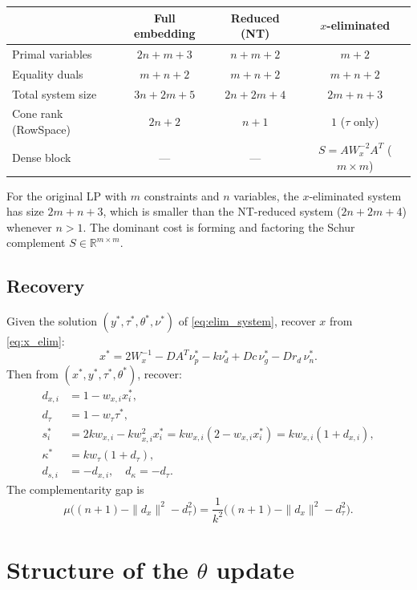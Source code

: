 \documentclass{article}
\newcommand{\R}{\mathbb{R}}
\begin{document}
\begin{center}
\begin{tabular}{lccc}
  & Full embedding & Reduced (NT) & $x$-eliminated \\
  \hline
  Primal variables & $2n + m + 3$ & $n + m + 2$ & $m + 2$ \\
  Equality duals & $m + n + 2$ & $m + n + 2$ & $m + n + 2$ \\
  Total system size & $3n + 2m + 5$ & $2n + 2m + 4$ & $2m + n + 3$ \\
  Cone rank (RowSpace) & $2n + 2$ & $n + 1$ & $1$ ($\tau$ only) \\
  Dense block & --- & --- & $S = AW_x^{-2}A^T$ ($m \times m$) \\
\end{tabular}
\end{center}

For the original LP with $m$ constraints and $n$ variables, the $x$-eliminated system has size $2m + n + 3$, which is smaller than the NT-reduced system ($2n + 2m + 4$) whenever $n > 1$. The dominant cost is forming and factoring the Schur complement $S \in \R^{m \times m}$.

\subsection{Recovery}

Given the solution $(y^*, \tau^*, \theta^*, \nu^*)$ of \eqref{eq:elim_system}, recover $x$ from \eqref{eq:x_elim}:
\[
  x^* = 2W_x^{-1} - DA^T\nu_p^* - k\nu_d^* + Dc\,\nu_g^* - Dr_d\,\nu_n^*.
\]
Then from $(x^*, y^*, \tau^*, \theta^*)$, recover:
\begin{align}
  d_{x,i} &= 1 - w_{x,i} x^*_i, \\
  d_\tau &= 1 - w_\tau \tau^*, \\
  s^*_i &= 2k w_{x,i} - k w_{x,i}^2 x^*_i = k w_{x,i}(2 - w_{x,i} x^*_i) = k w_{x,i}(1 + d_{x,i}), \\
  \kappa^* &= k w_\tau(1 + d_\tau), \\
  d_{s,i} &= -d_{x,i}, \quad d_\kappa = -d_\tau.
\end{align}
The complementarity gap is
\[
  \mu \bigl((n+1) - \|d_x\|^2 - d_\tau^2\bigr) = \frac{1}{k^2}\bigl((n+1) - \|d_x\|^2 - d_\tau^2\bigr).
\]

\section{Structure of the $\theta$ update}
\end{document}
